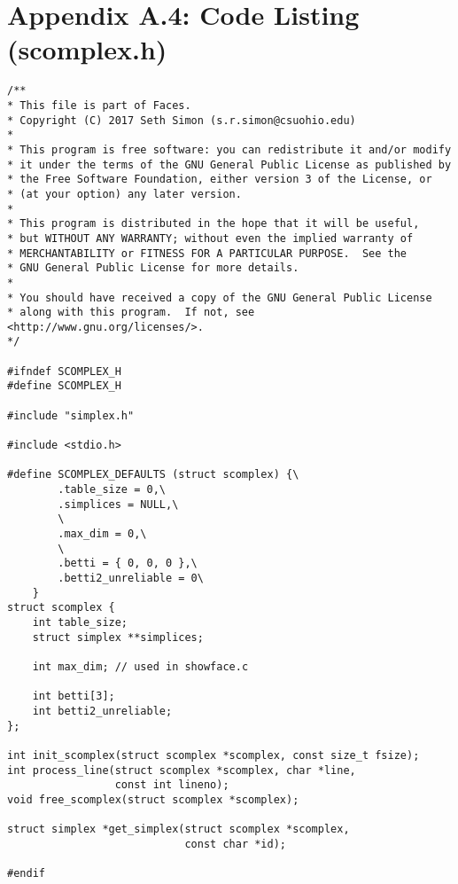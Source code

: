 \documentclass{article}
\begin{document}
\section{Appendix A.4: Code Listing (scomplex.h)}
\small
\begin{verbatim}
/**
* This file is part of Faces.
* Copyright (C) 2017 Seth Simon (s.r.simon@csuohio.edu)
* 
* This program is free software: you can redistribute it and/or modify
* it under the terms of the GNU General Public License as published by
* the Free Software Foundation, either version 3 of the License, or
* (at your option) any later version.
* 
* This program is distributed in the hope that it will be useful,
* but WITHOUT ANY WARRANTY; without even the implied warranty of
* MERCHANTABILITY or FITNESS FOR A PARTICULAR PURPOSE.  See the
* GNU General Public License for more details.
* 
* You should have received a copy of the GNU General Public License
* along with this program.  If not, see <http://www.gnu.org/licenses/>.
*/

#ifndef SCOMPLEX_H
#define SCOMPLEX_H

#include "simplex.h"

#include <stdio.h>

#define SCOMPLEX_DEFAULTS (struct scomplex) {\
        .table_size = 0,\
        .simplices = NULL,\
        \
        .max_dim = 0,\
        \
        .betti = { 0, 0, 0 },\
        .betti2_unreliable = 0\
    }
struct scomplex {
    int table_size;
    struct simplex **simplices;

    int max_dim; // used in showface.c

    int betti[3];
    int betti2_unreliable;
};

int init_scomplex(struct scomplex *scomplex, const size_t fsize);
int process_line(struct scomplex *scomplex, char *line,
                 const int lineno);
void free_scomplex(struct scomplex *scomplex);

struct simplex *get_simplex(struct scomplex *scomplex,
                            const char *id);

#endif
\end{verbatim}
\normalsize
\end{document}

